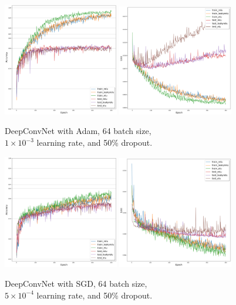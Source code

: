 	\begin{figure}[H]
		\centering
		\includegraphics[width=0.45\textwidth]{results/deepconvnet_adam_64_0.001_0.5_acc.png}
		\includegraphics[width=0.45\textwidth]{results/deepconvnet_adam_64_0.001_0.5_loss.png}
		\caption{DeepConvNet with Adam, 64 batch size, \\ $1 \times 10^{-3}$ learning rate, and 50\% dropout.}
	\end{figure}
	\begin{figure}[H]
		\centering
		\includegraphics[width=0.45\textwidth]{results/deepconvnet_sgd_64_0.0005_0.5_acc.png}
		\includegraphics[width=0.45\textwidth]{results/deepconvnet_sgd_64_0.0005_0.5_loss.png}
		\caption{DeepConvNet with SGD, 64 batch size, \\ $5 \times 10^{-4}$ learning rate, and 50\% dropout.}
	\end{figure}
